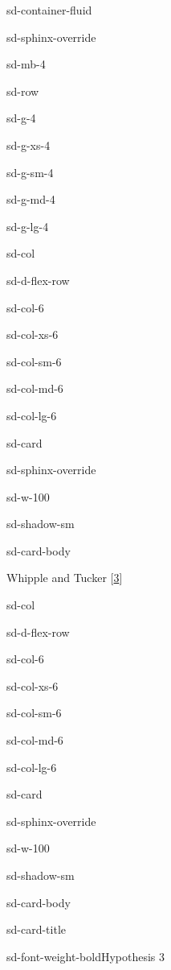 \documentclass[letterpaper,10pt,english]{jupyterBook}
\let\sphinxpxdimen\pdfpxdimen\else\newdimen\sphinxpxdimen
\begin{document}
\begin{sphinxuseclass}{sd-container-fluid}
\begin{sphinxuseclass}{sd-sphinx-override}
\begin{sphinxuseclass}{sd-mb-4}
\begin{sphinxuseclass}{sd-row}
\begin{sphinxuseclass}{sd-g-4}
\begin{sphinxuseclass}{sd-g-xs-4}
\begin{sphinxuseclass}{sd-g-sm-4}
\begin{sphinxuseclass}{sd-g-md-4}
\begin{sphinxuseclass}{sd-g-lg-4}
\begin{sphinxuseclass}{sd-col}
\begin{sphinxuseclass}{sd-d-flex-row}
\begin{sphinxuseclass}{sd-col-6}
\begin{sphinxuseclass}{sd-col-xs-6}
\begin{sphinxuseclass}{sd-col-sm-6}
\begin{sphinxuseclass}{sd-col-md-6}
\begin{sphinxuseclass}{sd-col-lg-6}
\begin{sphinxuseclass}{sd-card}
\begin{sphinxuseclass}{sd-sphinx-override}
\begin{sphinxuseclass}{sd-w-100}
\begin{sphinxuseclass}{sd-shadow-sm}
\begin{sphinxuseclass}{sd-card-body}
\noindent{\hspace*{\fill}\sphinxincludegraphics[width=200\sphinxpxdimen]{{whipple-tucker}.png}\hspace*{\fill}}

\sphinxAtStartPar
Whipple and Tucker {[}\hyperlink{cite.references:id3}{3}{]}

\end{sphinxuseclass}
\end{sphinxuseclass}
\end{sphinxuseclass}
\end{sphinxuseclass}
\end{sphinxuseclass}
\end{sphinxuseclass}
\end{sphinxuseclass}
\end{sphinxuseclass}
\end{sphinxuseclass}
\end{sphinxuseclass}
\end{sphinxuseclass}
\end{sphinxuseclass}
\begin{sphinxuseclass}{sd-col}
\begin{sphinxuseclass}{sd-d-flex-row}
\begin{sphinxuseclass}{sd-col-6}
\begin{sphinxuseclass}{sd-col-xs-6}
\begin{sphinxuseclass}{sd-col-sm-6}
\begin{sphinxuseclass}{sd-col-md-6}
\begin{sphinxuseclass}{sd-col-lg-6}
\begin{sphinxuseclass}{sd-card}
\begin{sphinxuseclass}{sd-sphinx-override}
\begin{sphinxuseclass}{sd-w-100}
\begin{sphinxuseclass}{sd-shadow-sm}
\begin{sphinxuseclass}{sd-card-body}
\begin{sphinxuseclass}{sd-card-title}
\begin{sphinxuseclass}{sd-font-weight-bold}Hypothesis 3

\end{sphinxuseclass}
\end{sphinxuseclass}
\end{sphinxuseclass}
\end{sphinxuseclass}
\end{sphinxuseclass}
\end{sphinxuseclass}
\end{sphinxuseclass}
\end{sphinxuseclass}
\end{sphinxuseclass}
\end{sphinxuseclass}
\end{sphinxuseclass}
\end{sphinxuseclass}
\end{sphinxuseclass}
\end{sphinxuseclass}
\end{sphinxuseclass}
\end{sphinxuseclass}
\end{sphinxuseclass}
\end{sphinxuseclass}
\end{sphinxuseclass}
\end{sphinxuseclass}
\end{sphinxuseclass}
\end{sphinxuseclass}
\end{sphinxuseclass}
\end{document}
